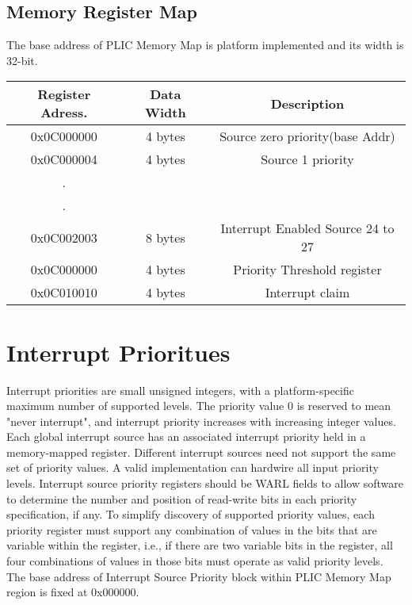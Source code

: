 \subsection{Memory Register Map}
The base address of PLIC Memory Map is platform implemented and its width is 32-bit.
\begin{center}
\begin{tabular}{|c|c|c|} 
 \hline
Register Adress. & Data Width & Description \\ [0.5ex] 
 \hline
 0x0C000000 & 4 bytes & Source zero priority(base Addr) \\ [1ex]
 \hline
 0x0C000004 & 4 bytes & Source 1 priority \\ [1ex]
 \hline
.\\[0.2ex]
.\\[0.2ex]

\hline
 0x0C002003 & 8 bytes & Interrupt Enabled Source 24 to 27 \\ [1ex]
 \hline
 0x0C000000 & 4 bytes & Priority Threshold register \\ [1ex]
 \hline
 0x0C010010 & 4 bytes & Interrupt claim \\ [1ex]
\hline
\end{tabular}

\end{center}

\section{Interrupt Prioritues}
Interrupt priorities are small unsigned integers, with a platform-specific maximum number of supported levels. The priority value 0 is reserved to mean "never interrupt", and interrupt priority increases with increasing integer values. Each global interrupt source has an associated interrupt priority held in a memory-mapped register. Different interrupt sources need not support the same set of priority values. A valid implementation can hardwire all input priority levels. Interrupt source priority registers should be WARL fields to allow software to determine the number and position of read-write bits in each priority specification, if any. To simplify discovery of supported priority values, each priority register must support any combination of values in the bits that are variable within the register, i.e., if there are two variable bits in the register, all four combinations of values in those bits must operate as valid priority levels. The base address of Interrupt Source Priority block within PLIC Memory Map region is fixed at
0x000000.

